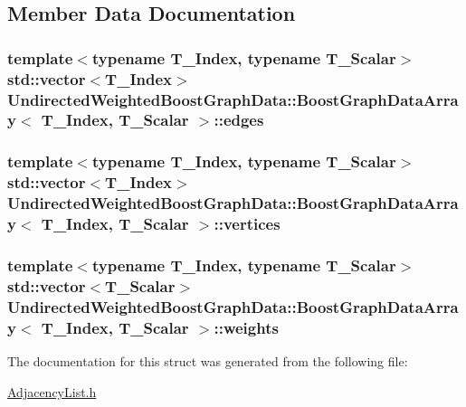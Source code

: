 \subsection{Member Data Documentation}
\hypertarget{struct_undirected_weighted_graph_1_1_graph_array_ae11fa2a6dad43302b76d8c0c3cd43b8e}{
\subsubsection[{edges}]{\setlength{\rightskip}{0pt plus 5cm}template$<$typename T\+\_\+\+Index, typename T\+\_\+\+Scalar$>$ std\+::vector$<$T\+\_\+\+Index$>$ {\bf Undirected\+Weighted\+BoostGraphData\+::\+BoostGraphData\+Array}$<$ T\+\_\+\+Index, T\+\_\+\+Scalar $>$\+::edges}}\label{struct_undirected_weighted_graph_1_1_graph_array_ae11fa2a6dad43302b76d8c0c3cd43b8e}
\hypertarget{struct_undirected_weighted_graph_1_1_graph_array_a81fa36cd9facc14c41f4fcccde694f15}{
\subsubsection[{vertices}]{\setlength{\rightskip}{0pt plus 5cm}template$<$typename T\+\_\+\+Index, typename T\+\_\+\+Scalar$>$ std\+::vector$<$T\+\_\+\+Index$>$ {\bf Undirected\+Weighted\+BoostGraphData\+::\+BoostGraphData\+Array}$<$ T\+\_\+\+Index, T\+\_\+\+Scalar $>$\+::vertices}}\label{struct_undirected_weighted_graph_1_1_graph_array_a81fa36cd9facc14c41f4fcccde694f15}
\hypertarget{struct_undirected_weighted_graph_1_1_graph_array_a56c78312ffe5c1948aeaf930cbb61fb3}{
\subsubsection[{weights}]{\setlength{\rightskip}{0pt plus 5cm}template$<$typename T\+\_\+\+Index, typename T\+\_\+\+Scalar$>$ std\+::vector$<$T\+\_\+\+Scalar$>$ {\bf Undirected\+Weighted\+BoostGraphData\+::\+BoostGraphData\+Array}$<$ T\+\_\+\+Index, T\+\_\+\+Scalar $>$\+::weights}}\label{struct_undirected_weighted_graph_1_1_graph_array_a56c78312ffe5c1948aeaf930cbb61fb3}


The documentation for this struct was generated from the following file\+:\begin{DoxyCompactItemize}
\item 
\hyperlink{_adjacency_list_8h}{Adjacency\+List.\+h}\end{DoxyCompactItemize}
